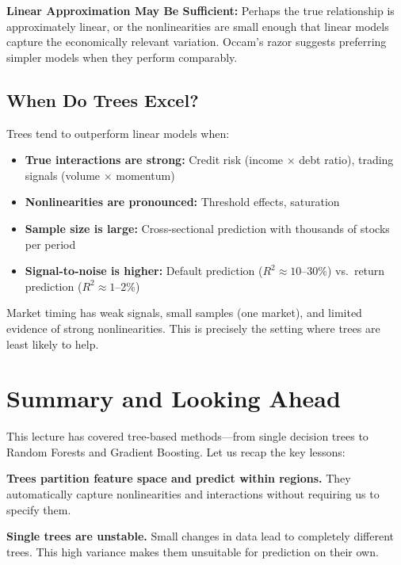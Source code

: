 \documentclass[11pt,a4paper]{article}
\begin{document}
\textbf{Linear Approximation May Be Sufficient:} Perhaps the true relationship is approximately linear, or the nonlinearities are small enough that linear models capture the economically relevant variation. Occam's razor suggests preferring simpler models when they perform comparably.

\subsection{When Do Trees Excel?}

Trees tend to outperform linear models when:
\begin{itemize}
    \item \textbf{True interactions are strong:} Credit risk (income $\times$ debt ratio), trading signals (volume $\times$ momentum)
    \item \textbf{Nonlinearities are pronounced:} Threshold effects, saturation
    \item \textbf{Sample size is large:} Cross-sectional prediction with thousands of stocks per period
    \item \textbf{Signal-to-noise is higher:} Default prediction ($R^2 \approx 10$--30\%) vs.\ return prediction ($R^2 \approx 1$--2\%)
\end{itemize}

Market timing has weak signals, small samples (one market), and limited evidence of strong nonlinearities. This is precisely the setting where trees are least likely to help.

\section{Summary and Looking Ahead}

This lecture has covered tree-based methods---from single decision trees to Random Forests and Gradient Boosting. Let us recap the key lessons:

\textbf{Trees partition feature space and predict within regions.} They automatically capture nonlinearities and interactions without requiring us to specify them.

\textbf{Single trees are unstable.} Small changes in data lead to completely different trees. This high variance makes them unsuitable for prediction on their own.
\end{document}
